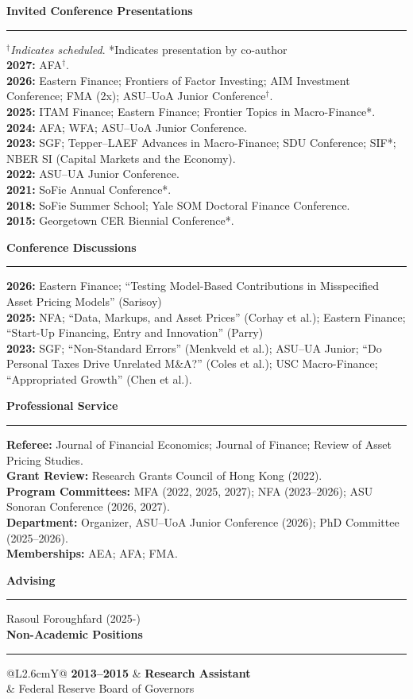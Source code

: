 \documentclass[11pt]{article}
\makeatletter
\newcommand{\sectionline}{\vspace{-7pt}\noindent\rule{\textwidth}{0.4pt}\vspace{6pt}}
\newcommand{\cvsection}[1]{\vspace{10pt}\textbf{\large #1}\par\sectionline}
\newcommand{\cvitem}[4]{%
  \begin{tabularx}{\textwidth}{@{}L{2.6cm}Y@{}}%
    \textbf{#1} & \textbf{#2} \\
                & #3 \\
    \multicolumn{2}{@{}l@{}}{#4} \\
  \end{tabularx}\vspace{-5pt}%
}
\makeatother
\begin{document}
\cvsection{Invited Conference Presentations}
\footnotesize{$^\dagger$\textit{Indicates scheduled}. *Indicates presentation by co-author}\\
\textbf{2027:} AFA$^\dagger$.\\
\textbf{2026:} Eastern Finance; Frontiers of Factor Investing; AIM Investment Conference; FMA (2x); ASU–UoA Junior Conference$^\dagger$.\\
\textbf{2025:} ITAM Finance; Eastern Finance; Frontier Topics in Macro-Finance*. \\
\textbf{2024:} AFA; WFA; ASU–UoA Junior Conference. \\
\textbf{2023:} SGF; Tepper–LAEF Advances in Macro-Finance; SDU Conference; SIF*; NBER SI (Capital Markets and the Economy). \\
\textbf{2022:} ASU–UA Junior Conference. \\
\textbf{2021:} SoFie Annual Conference*. \\
\textbf{2018:} SoFie Summer School; Yale SOM Doctoral Finance Conference. \\
\textbf{2015:} Georgetown CER Biennial Conference*.


\cvsection{Conference Discussions}
\textbf{2026:} Eastern Finance; ``Testing Model-Based Contributions in Misspecified Asset Pricing Models'' (Sarisoy)\\
\textbf{2025:} NFA; “Data, Markups, and Asset Prices” (Corhay et al.); Eastern Finance; “Start-Up Financing, Entry and Innovation” (Parry) \\
\textbf{2023:} SGF; “Non-Standard Errors” (Menkveld et al.); ASU–UA Junior; “Do Personal Taxes Drive Unrelated M\&A?” (Coles et al.); USC Macro-Finance; “Appropriated Growth” (Chen et al.).




\cvsection{Professional Service}
\textbf{Referee:} Journal of Financial Economics; Journal of Finance; Review of Asset Pricing Studies. \\
\textbf{Grant Review:} Research Grants Council of Hong Kong (2022). \\
\textbf{Program Committees:} MFA (2022, 2025, 2027); NFA (2023–2026); ASU Sonoran Conference (2026, 2027). \\
\textbf{Department:} Organizer, ASU–UoA Junior Conference (2026); PhD Committee (2025–2026). \\
\textbf{Memberships:} AEA; AFA; FMA.


\cvsection{Advising}
Rasoul Foroughfard (2025-)\\



\cvsection{Non-Academic Positions}
\cvitem{2013–2015}{Research Assistant}{Federal Reserve Board of Governors}{}
\end{document}
